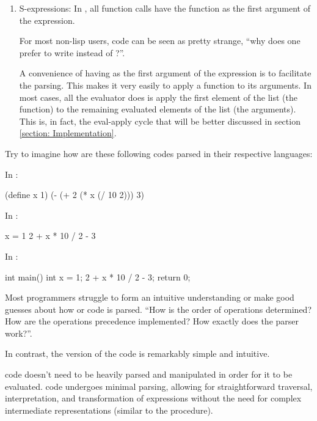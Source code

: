 \begin{enumerate}
    \item S-expressions: In , all function calls have the function as the first argument of the expression.

    For most non-lisp users,  code can be seen as pretty strange, ``why does one prefer to write  instead of ?''.

    A convenience of having \var{+} as the first argument of the expression is to facilitate the parsing. This makes it very easily to apply a function to its arguments. In most cases, all the  evaluator does is apply the first element of the list (the function) to the remaining evaluated elements of the list (the arguments). This is, in fact, the eval-apply cycle that will be better discussed in section \ref{section: Implementation}.
  \end{enumerate}

  Try to imagine how are these following codes parsed in their respective languages:

  \noindent
  \begin{minipage}[t]{0.34\textwidth}
    In :
    \begin{code}
(define x 1)
(- (+ 2
      (* x
         (/ 10
            2)))
   3)
    \end{code}
  \end{minipage}
  \hfill
  \begin{minipage}[t]{0.32\textwidth}
    In :
    \begin{code}
x = 1
2 + x * 10 / 2 - 3
    \end{code}
  \end{minipage}
  \hfill
  \begin{minipage}[t]{0.32\textwidth}
    In :
    \begin{code}
int main() {
  int x = 1;
  2 + x * 10 / 2 - 3;
  return 0;
}
    \end{code}
  \end{minipage}

  Most programmers struggle to form an intuitive understanding or make good guesses about how  or  code is parsed. ``How is the order of operations determined? How are the operations precedence implemented? How exactly does the parser work?''.

  In contrast, the  version of the code is remarkably simple and intuitive.

   code doesn't need to be heavily parsed and manipulated in order for it to be evaluated.  code undergoes minimal parsing, allowing for straightforward traversal, interpretation, and transformation of expressions without the need for complex intermediate representations (similar to the  procedure).


